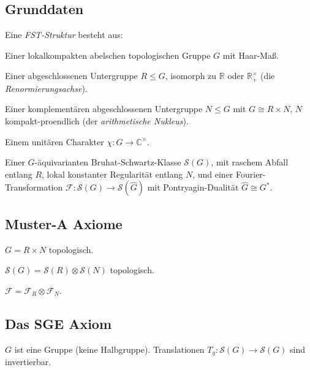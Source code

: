 \documentclass[11pt,a4paper]{article}
\theoremstyle{plain}
\theoremstyle{definition}
\newcommand{\C}{\mathbb{C}}
\newcommand{\R}{\mathbb{R}}
\renewcommand{\S}{\mathcal{S}}
\newcommand{\chifn}{\chi}
\begin{document}
\subsection{Grunddaten}

Eine \emph{FST-Struktur} besteht aus:

\begin{description}[style=nextline]
\item[(G)] Einer lokalkompakten abelschen topologischen Gruppe $G$ mit Haar-Maß.
\item[(R)] Einer abgeschlossenen Untergruppe $R \leq G$, isomorph zu $\R$ oder
  $\R_+^\times$ (die \emph{Renormierungsachse}).
\item[(N)] Einer komplementären abgeschlossenen Untergruppe $N \leq G$ mit $G
  \cong R \times N$, $N$ kompakt-proendlich (der \emph{arithmetische Nukleus}).
\item[($\chifn$)] Einem unitären Charakter $\chifn : G \to \C^\times$.
\item[(S)] Einer $G$-äquivarianten Bruhat-Schwartz-Klasse $\S(G)$, mit
  raschem Abfall entlang $R$, lokal konstanter Regularität entlang $N$,
  und einer Fourier-Transformation $\mathcal F : \S(G) \to \S(\hat G)$
  mit Pontryagin-Dualität $\hat G \cong G^\ast$.
\end{description}

\subsection{Muster-A Axiome}

\begin{description}[style=nextline]
\item[(P1)] $G = R \times N$ topologisch.
\item[(P2)] $\S(G) = \S(R) \otimes \S(N)$ topologisch.
\item[(P3)] $\mathcal F = \mathcal F_R \otimes \mathcal F_N$.
\end{description}

\subsection{Das SGE Axiom}

\begin{description}[style=nextline]
\item[(SGE)] $G$ ist eine Gruppe (keine Halbgruppe). Translationen $T_g:
  \S(G) \to \S(G)$ sind invertierbar.
\end{description}
\end{document}
